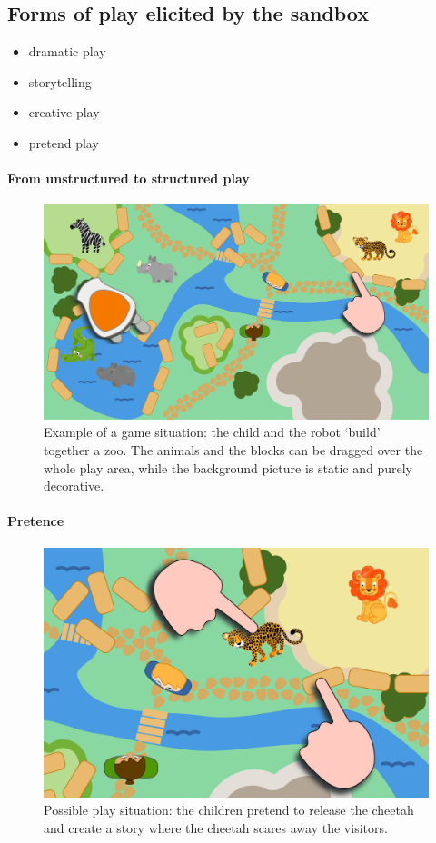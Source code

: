 \documentclass[a4paper]{article}
\begin{document}
\subsection{Forms of play elicited by the sandbox}

\begin{itemize}
    \item dramatic play
    \item storytelling
    \item creative play
    \item pretend play
\end{itemize}

\paragraph{From unstructured to structured play}

\begin{figure}
    \centering
    \includegraphics[width=0.9\linewidth]{sandbox}
    \caption{Example of a game situation: the child and the robot `build'
    together a zoo. The animals and the blocks can be dragged over the whole
    play area, while the background picture is static and purely decorative.}
    \label{fig|sandbox}
\end{figure}


\paragraph{Pretence}

\begin{figure}
    \centering
    \includegraphics[width=0.7\linewidth]{sandbox-release-cheetah}
    \caption{Possible play situation: the children pretend to release the cheetah
    and create a story where the cheetah scares away the visitors.}
    \label{}
\end{figure}
\end{document}
